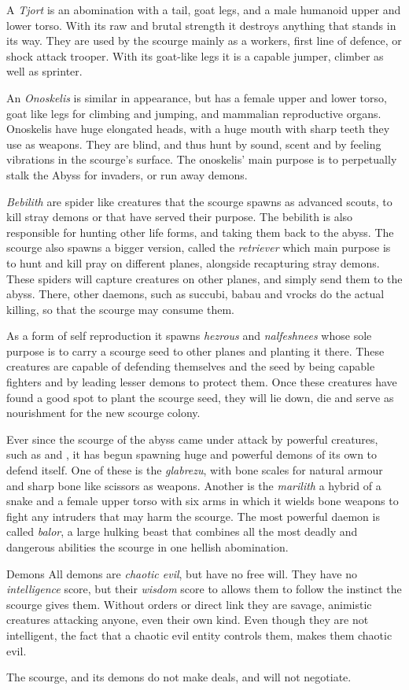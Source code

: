 A \emph{Tjort} is an abomination with a tail, goat legs, and a male humanoid
upper and lower torso. With its raw and brutal strength it destroys anything
that stands in its way. They are used by the scourge mainly as a workers, first
line of defence, or shock attack trooper. With its goat-like legs it is a
capable jumper, climber as well as sprinter.

An \emph{Onoskelis} is similar in appearance, but has a female upper and lower
torso, goat like legs for climbing and jumping, and mammalian reproductive
organs. Onoskelis have huge elongated heads, with a huge mouth with sharp
teeth they use as weapons. They are blind, and thus hunt by sound, scent and
by feeling vibrations in the scourge's surface. The onoskelis' main purpose is
to perpetually stalk the Abyss for invaders, or run away demons.

\emph{Bebilith} are spider like creatures that the scourge spawns as advanced
scouts, to kill stray demons or that have served their purpose. The bebilith
is also responsible for hunting other life forms, and taking them back to the
abyss. The scourge also spawns a bigger version, called the \emph{retriever}
which main purpose is to hunt and kill pray on different planes, alongside
recapturing stray demons. These spiders will capture creatures on other planes,
and simply send them to the abyss. There, other daemons, such as succubi,
babau and vrocks do the actual killing, so that the scourge may consume them.

As a form of self reproduction it spawns \emph{hezrous} and \emph{nalfeshnees}
whose sole purpose is to carry a scourge seed to other planes and planting
it there. These creatures are capable of defending themselves and the seed
by being capable fighters and by leading lesser demons to protect them. Once
these creatures have found a good spot to plant the scourge seed, they will
lie down, die and serve as nourishment for the new scourge colony.

Ever since the scourge of the abyss came under attack by powerful creatures,
such as  and , it has begun spawning
huge and powerful demons of its own to defend itself. One of these is the
\emph{glabrezu}, with bone scales for natural armour and sharp bone like
scissors as weapons. Another is the \emph{marilith} a hybrid of a snake and
a female upper torso with six arms in which it wields bone weapons to fight
any intruders that may harm the scourge. The most powerful daemon is called
\emph{balor}, a large hulking beast that combines all the most deadly and
dangerous abilities the scourge in one hellish abomination.

\begin{35e}{Demons}
  All demons are \emph{chaotic evil}, but have no free will. They
  have no \emph{intelligence} score, but their \emph{wisdom} score to allows
  them to follow the instinct the scourge gives them. Without orders or direct
  link they are savage, animistic creatures attacking anyone, even their own
  kind. Even though they are not intelligent, the fact that a chaotic evil
  entity controls them, makes them chaotic evil.

  The scourge, and its demons do not make deals, and will not negotiate.
\end{35e}
